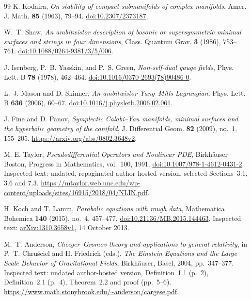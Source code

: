 \documentclass[11pt]{article}
\numberwithin{equation}{section}
\theoremstyle{definition}
\theoremstyle{remark}
\begin{document}
\begin{thebibliography}{99}
K. Kodaira,
\emph{On stability of compact submanifolds of complex manifolds},
Amer. J. Math. \textbf{85} (1963), 79--94.
\href{https://doi.org/10.2307/2373187}{doi:10.2307/2373187}.

W.~T. Shaw,
\emph{An ambitwistor description of bosonic or supersymmetric minimal
surfaces and strings in four dimensions},
Class. Quantum Grav. \textbf{3} (1986), 753--761.
\href{https://doi.org/10.1088/0264-9381/3/5/006}{doi:10.1088/0264-9381/3/5/006}.

J. Isenberg, P.~B. Yasskin, and P.~S. Green,
\emph{Non-self-dual gauge fields},
Phys. Lett. B \textbf{78} (1978), 462--464.
\href{https://doi.org/10.1016/0370-2693(78)90486-0}{doi:10.1016/0370-2693(78)90486-0}.

L.~J. Mason and D. Skinner,
\emph{An ambitwistor Yang--Mills Lagrangian},
Phys. Lett. B \textbf{636} (2006), 60--67.
\href{https://doi.org/10.1016/j.physletb.2006.02.061}{doi:10.1016/j.physletb.2006.02.061}.

J. Fine and D. Panov,
\emph{Symplectic Calabi--Yau manifolds, minimal surfaces and the hyperbolic geometry of the conifold},
J. Differential Geom. \textbf{82} (2009), no.~1, 155--205.
\url{https://arxiv.org/abs/0802.3648v2}.

M. E. Taylor,
\emph{Pseudodifferential Operators and Nonlinear PDE},
Birkh\"auser Boston, Progress in Mathematics, vol.~100, 1991.
\href{https://doi.org/10.1007/978-1-4612-0431-2}{doi:10.1007/978-1-4612-0431-2}.
Inspected text: undated, repaginated author-hosted version,
selected Sections~3.1, 3.6 and 7.3.
\url{https://mtaylor.web.unc.edu/wp-content/uploads/sites/16915/2018/04/NLIN.pdf}.

H. Koch and T. Lamm,
\emph{Parabolic equations with rough data},
Mathematica Bohemica \textbf{140} (2015), no.~4, 457--477.
\href{https://doi.org/10.21136/MB.2015.144463}{doi:10.21136/MB.2015.144463}.
Inspected text: \href{https://arxiv.org/abs/1310.3658v1}{arXiv:1310.3658v1},
14 October 2013.

M.~T. Anderson,
\emph{Cheeger--Gromov theory and applications to general relativity},
in P.~T. Chru\'sciel and H. Friedrich (eds.),
\emph{The Einstein Equations and the Large Scale Behavior of Gravitational Fields},
Birkh\"auser, Basel, 2004, pp.~347--377.
Inspected text: undated author-hosted version, Definition~1.1 (p.~2),
Definition~2.1 (p.~4), Theorem~2.2 and proof (pp.~5--6).
\url{https://www.math.stonybrook.edu/~anderson/cargese.pdf}.


\end{thebibliography}
\end{document}
